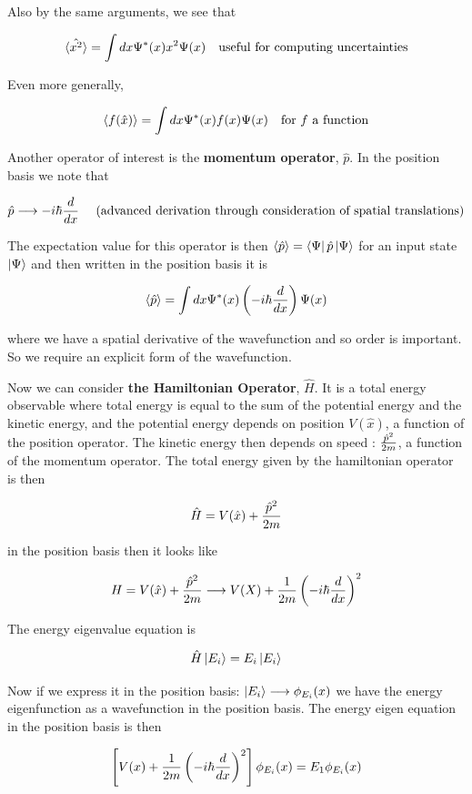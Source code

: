 \documentclass[english, 11pt]{article}
\begin{document}
\begin{itemize}
      Also by the same arguments, we see that

      \[ \langle \hat{x^2} \rangle = \int dx \Psi^*(x) x^2 \Psi(x) \ \ \ \mbox{useful for computing uncertainties} \]

      Even more generally,

      \[ \langle f(\hat{x}) \rangle = \int dx \Psi^*(x) f(x) \Psi(x) \ \ \ \mbox{for $f$ a function} \]

      Another operator of interest is the \textbf{momentum operator}, $\hat{p}$. In the position basis we note that

      \[ \hat{p} \longrightarrow -i\hbar \frac{d}{dx} \ \ \ \ \mbox{(advanced derivation through consideration of spatial translations)} \]

      The expectation value for this operator is then $\langle \hat{p} \rangle = \left\langle\Psi\right|\hat{p}\left|\Psi\right\rangle$ for an input state $\left|\Psi\right\rangle$ and then written in the position basis it is

      \[ \langle \hat{p} \rangle = \int dx \Psi^*(x) \left( -i\hbar \frac{d}{dx} \right) \Psi(x) \]

      where we have a spatial derivative of the wavefunction and so order is important. So we require an explicit form of the wavefunction.\newline

      Now we can consider \textbf{the Hamiltonian Operator}, $\hat{H}$. It is a total energy observable where total energy is equal to the sum of the potential energy and the kinetic energy, and the potential energy depends on position $V(\hat{x})$, a function of the position operator. The kinetic energy then depends on speed : $\frac{\hat{p}^2}{2m}$, a function of the momentum operator. The total energy given by the hamiltonian operator is then

      \[ \hat{H} = V(\hat{x}) + \frac{\hat{p}^2}{2m} \]

      in the position basis then it looks like

      \[ H = V(\hat{x}) + \frac{\hat{p}^2}{2m} \longrightarrow V(X) + \frac{1}{2m} \left( -i\hbar \frac{d}{dx} \right)^2 \]

      The energy eigenvalue equation is

      \[ \hat{H}\left|E_i\right\rangle = E_i\left|E_i\right\rangle \]

      Now if we express it in the position basis: $\left|E_i\right\rangle \longrightarrow \phi_{E_i}(x)$ we have the energy eigenfunction as a wavefunction in the position basis. The energy eigen equation in the position basis is then

      \[ \left[ V(x) + \frac{1}{2m} \left( -i\hbar \frac{d}{d x} \right)^2 \right] \phi_{E_i}(x) = E_1 \phi_{E_i}(x) \]


\end{itemize}
\end{document}
